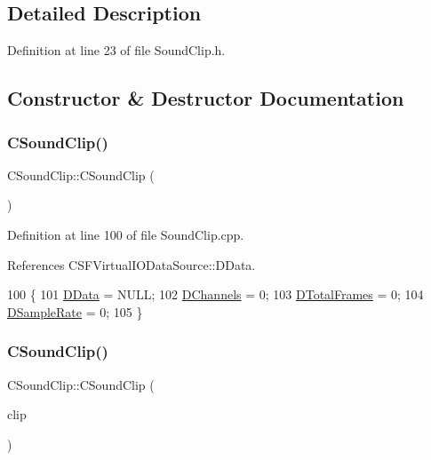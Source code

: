 \subsection{Detailed Description}


Definition at line 23 of file Sound\+Clip.\+h.



\subsection{Constructor \& Destructor Documentation}
\hypertarget{classCSoundClip_af65407e991db78fb13c6e9fdec122dd6}{}\label{classCSoundClip_af65407e991db78fb13c6e9fdec122dd6} 
\subsubsection{\texorpdfstring{C\+Sound\+Clip()}{CSoundClip()}\hspace{0.1cm}{\footnotesize\ttfamily [1/2]}}
{\footnotesize\ttfamily C\+Sound\+Clip\+::\+C\+Sound\+Clip (\begin{DoxyParamCaption}{ }\end{DoxyParamCaption})}



Definition at line 100 of file Sound\+Clip.\+cpp.



References C\+S\+F\+Virtual\+I\+O\+Data\+Source\+::\+D\+Data.


\begin{DoxyCode}
100                       \{
101     \hyperlink{classCSoundClip_a220921a0c81e5c63e2cd3c55c75878b1}{DData} = NULL;
102     \hyperlink{classCSoundClip_a01aaf0b87b9b8226c77a6931d03d6a64}{DChannels} = 0;
103     \hyperlink{classCSoundClip_ab0d9eb261d09fa2a106658276f37285b}{DTotalFrames} = 0;
104     \hyperlink{classCSoundClip_ac1b9306140da2f89f6178833e0a9b887}{DSampleRate} = 0;
105 \}
\end{DoxyCode}
\hypertarget{classCSoundClip_aa7f0a4b8587e351d3ecf952b28d4b9b3}{}\label{classCSoundClip_aa7f0a4b8587e351d3ecf952b28d4b9b3} 
\subsubsection{\texorpdfstring{C\+Sound\+Clip()}{CSoundClip()}\hspace{0.1cm}{\footnotesize\ttfamily [2/2]}}
{\footnotesize\ttfamily C\+Sound\+Clip\+::\+C\+Sound\+Clip (\begin{DoxyParamCaption}\item[{const \hyperlink{classCSoundClip}{C\+Sound\+Clip} \&}]{clip }\end{DoxyParamCaption})}



